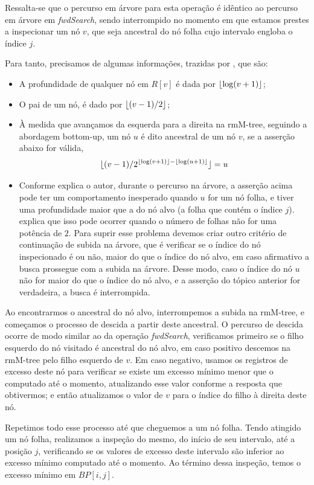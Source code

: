     Ressalta-se que o percurso em árvore para esta operação é idêntico ao percurso em árvore em \textit{fwdSearch}, sendo interrompido no momento em que estamos prestes a inspecionar um nó $v$, que seja ancestral do nó folha cujo intervalo engloba o índice $j$.

    Para tanto, precisamos de algumas informações, trazidas por \citet{book-compact-data-structures}, que são:
    \begin{itemize}
        \item A profundidade de qualquer nó em $R[v]$ é dada por $\lfloor\log (v + 1 )\rfloor$;
        \item O pai de um nó, é dado por $\lfloor(v-1)/2\rfloor$;
        \item À medida que avançamos da esquerda para a direita na rmM-tree, seguindo a abordagem bottom-up, um nó $u$ é dito ancestral de um nó $v$, se a asserção abaixo for válida,
        $$\lfloor(v-1)/2^{\lfloor\log (v+1)\rfloor - \lfloor\log (u+1)\rfloor}\rfloor = u$$
        \item Conforme explica o autor, durante o percurso na árvore, a asserção acima pode ter um comportamento inesperado quando  $u$ for um nó folha, e tiver uma profundidade maior que a do nó alvo (a folha que contém o índice $j$). \citet{book-compact-data-structures} explica que isso pode ocorrer quando o número de folhas não for uma potência de $2$. 
        Para suprir esse problema devemos criar outro critério de continuação de subida na árvore, que é verificar se o índice do nó inspecionado é ou não, maior do que o índice do nó alvo, em caso afirmativo a busca prossegue com a subida na árvore. Desse modo, caso o índice do nó $u$ não for maior do que o índice do nó alvo, e a asserção do tópico anterior for verdadeira, a busca é interrompida.
    \end{itemize}


    Ao encontrarmos o ancestral do nó alvo, interrompemos a subida na rmM-tree, e começamos o processo de descida a partir deste ancestral. O percurso de descida ocorre de modo similar ao da operação \textit{fwdSearch}, verificamos primeiro se o filho  esquerdo do nó visitado é ancestral do nó alvo, em caso positivo descemos na rmM-tree pelo filho esquerdo de $v$.  Em caso negativo, usamos os registros de excesso deste nó para verificar se existe um excesso mínimo menor que o computado até o momento, atualizando esse valor conforme a resposta que obtivermos; e então atualizamos o valor de $v$ para o índice do filho à direita deste nó. 

    Repetimos todo esse processo até que cheguemos a um nó folha. Tendo atingido um nó folha, realizamos a inspeção do mesmo, do início de seu intervalo, até a posição $j$, verificando se os valores de excesso deste intervalo são inferior ao excesso mínimo computado até o momento. Ao término dessa inspeção, temos o excesso mínimo em $BP[i,j]$.


